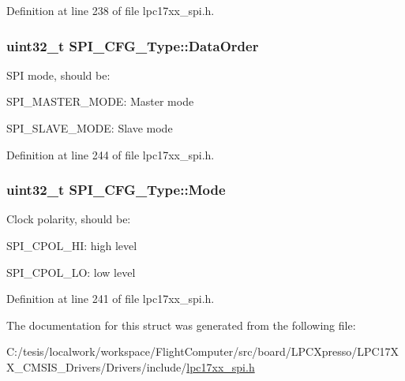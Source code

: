 \-Definition at line 238 of file lpc17xx\-\_\-spi.\-h.

\hypertarget{struct_s_p_i___c_f_g___type_a969aaaaa1124d8885329bbad2e087cf8}{
\subsubsection[{\-Data\-Order}]{\setlength{\rightskip}{0pt plus 5cm}uint32\-\_\-t {\bf \-S\-P\-I\-\_\-\-C\-F\-G\-\_\-\-Type\-::\-Data\-Order}}}\label{struct_s_p_i___c_f_g___type_a969aaaaa1124d8885329bbad2e087cf8}
\-S\-P\-I mode, should be\-:
\begin{DoxyItemize}
\item \-S\-P\-I\-\_\-\-M\-A\-S\-T\-E\-R\-\_\-\-M\-O\-D\-E\-: \-Master mode
\item \-S\-P\-I\-\_\-\-S\-L\-A\-V\-E\-\_\-\-M\-O\-D\-E\-: \-Slave mode 
\end{DoxyItemize}

\-Definition at line 244 of file lpc17xx\-\_\-spi.\-h.

\hypertarget{struct_s_p_i___c_f_g___type_a2b9fcae208b172aa6e6a065142ec2e97}{
\subsubsection[{\-Mode}]{\setlength{\rightskip}{0pt plus 5cm}uint32\-\_\-t {\bf \-S\-P\-I\-\_\-\-C\-F\-G\-\_\-\-Type\-::\-Mode}}}\label{struct_s_p_i___c_f_g___type_a2b9fcae208b172aa6e6a065142ec2e97}
\-Clock polarity, should be\-:
\begin{DoxyItemize}
\item \-S\-P\-I\-\_\-\-C\-P\-O\-L\-\_\-\-H\-I\-: high level
\item \-S\-P\-I\-\_\-\-C\-P\-O\-L\-\_\-\-L\-O\-: low level 
\end{DoxyItemize}

\-Definition at line 241 of file lpc17xx\-\_\-spi.\-h.



\-The documentation for this struct was generated from the following file\-:\begin{DoxyCompactItemize}
\item 
\-C\-:/tesis/localwork/workspace/\-Flight\-Computer/src/board/\-L\-P\-C\-Xpresso/\-L\-P\-C17\-X\-X\-\_\-\-C\-M\-S\-I\-S\-\_\-\-Drivers/\-Drivers/include/\hyperlink{lpc17xx__spi_8h}{lpc17xx\-\_\-spi.\-h}\end{DoxyCompactItemize}
